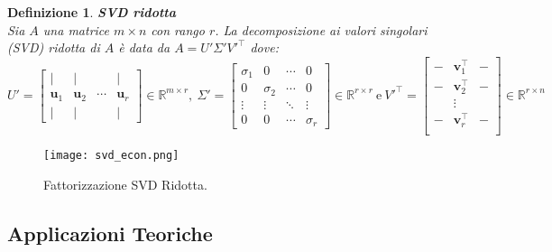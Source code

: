 \documentclass[11pt]{article}
\newtheorem{definition}{Definizione}
\newcommand{\R}{\mathbb{R}} %
\begin{document}
\begin{definition}
\textbf{SVD ridotta}\\
Sia $A$ una matrice $m \times n$ con rango $r$. La decomposizione ai valori singolari (SVD) ridotta di $A$ è data da $A = U' \Sigma' V'^\top$ dove:
\[
U' = 
\begin{bmatrix}
    | & | & & | \\
    \mathbf{u}_1 & \mathbf{u}_2 & \cdots & \mathbf{u}_r \\
    | & | & & |
\end{bmatrix} \in \R^{m \times r}, \ 
\Sigma' = 
\begin{bmatrix}
    \sigma_1 & 0 & \cdots & 0 \\
    0 & \sigma_2 & \cdots & 0 \\
    \vdots & \vdots & \ddots & \vdots \\
    0 & 0 & \cdots & \sigma_r
\end{bmatrix} \in \R^{r \times r} \ \text{e} \
V'^\top       = 
\begin{bmatrix}
    - & \mathbf{v}_1^\top       & - \\
    - & \mathbf{v}_2^\top       & - \\
    & \vdots & \\
    - & \mathbf{v}_r^\top       & - \\
\end{bmatrix} \in \R^{r \times n}
\]
\end{definition}
\begin{figure}[h]
    \centering
    \texttt{[image: svd\_econ.png]}
    \caption{Fattorizzazione SVD Ridotta.}
    \label{fig:svd_econ}
\end{figure}
\newpage
\subsection{Applicazioni Teoriche}
\end{document}
